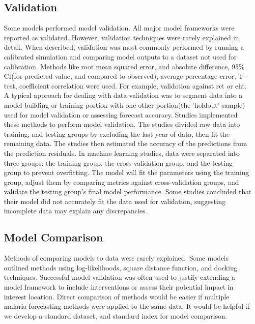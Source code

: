 \documentclass[a4paper, 12pt, twoside]{article}
\begin{document}
\subsection{Validation}%
\label{par:validation}
Some models performed model validation.
All major model frameworks were reported as validated.
However, validation techniques were rarely explained in detail.
When described, validation was most commonly performed by running a calibrated simulation and comparing model outputs to a dataset not used for calibration.
Methods like root mean squared error, and absolute difference\cite{Adimi2010, Rahman2011}, 95\% CI(for predicted value, and compared to observed)\cite{Chatterjee2009,Gomez-Elipe2007,Roy2011}, average percentage error\cite{Haghdoost2008}, T-test\cite{Xiao2010}, coefficient correlation\cite{Yacob1947} were used.
For example, validation against \gls{rct} or \gls{eht}.
A typical approach for dealing with data validation was to segment data into a model building or training portion with one other portion(the 'holdout' sample) used for model validation or assessing forecast accuracy.
Studies\cite{Parveen2021,Rahman2011} implemented these methods to perform model validation.
The studies divided raw data into training, and testing groups by excluding the last year of data, then fit the remaining data.
The studies then estimated the accuracy of the predictions from the prediction residuals.
In machine learning studies, data were separated into three groups: the training group, the cross-validation group, and the testing group to prevent overfitting.
The model will fit the parameters using the training group, adjust them by comparing metrics against cross-validation groups, and validate the testing group's final model performance.
Some studies concluded that their model did not accurately fit the data used for validation, suggesting incomplete data may explain any discrepancies.

\subsection{Model Comparison}%
\label{par:comparing_models}
Methods of comparing models to data were rarely explained.
Some models outlined methods using log-likelihoods, square distance function, and docking techniques.
Successful model validation was often used to justify extending a model framework to include interventions or assess their potential impact in interest location.
Direct comparison of methods would be easier if multiple malaria forecasting methods were applied to the same data.
It would be helpful if we develop a standard dataset, and standard index for model comparison.
\end{document}
